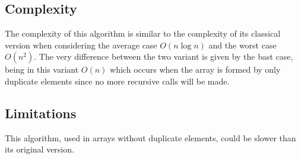 \begin{multicols}{2}
\subsection{Complexity}
The complexity of this algorithm is similar to the complexity of its classical version when considering the average case $O(n \log n)$ and the worst case $O(n^2)$. The very difference between the two variant is given by the bast case, being in this variant $O(n)$ which occurs when the array is formed by only duplicate elements since no more recursive calls will be made.

\subsection{Limitations}
This algorithm, used in arrays without duplicate elements, could be slower than its original version.

\end{multicols}